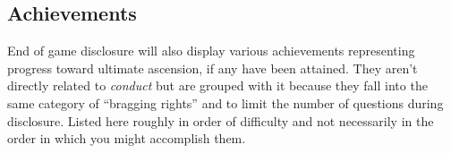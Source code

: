 \documentclass[titlepage]{article}
\begin{document}
\subsection*{Achievements}

End of game disclosure will also display various achievements
representing progress toward ultimate ascension, if any have been
attained.
They aren't directly related to \textit{conduct} but are grouped with
it because they fall into the same category of ``bragging rights''
and to limit the number of questions during disclosure.
Listed here roughly in order of difficulty and not necessarily in the order
in which you might accomplish them.

\newlength{\achwidth}
\addtolength{\achwidth}{\labelsep}
\end{document}
